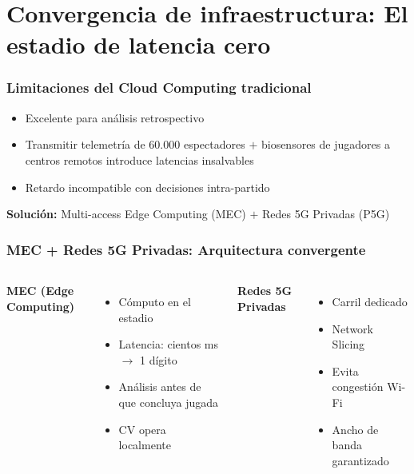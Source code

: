 \documentclass[aspectratio=169]{beamer}
\begin{document}
\section{Convergencia de infraestructura: El estadio de latencia cero}
\frame{\sectionpage}

\begin{frame}\frametitle{Limitaciones del Cloud Computing tradicional}
\begin{itemize}
    \item Excelente para análisis retrospectivo
    \item Transmitir telemetría de 60.000 espectadores $+$ biosensores de jugadores a centros remotos introduce latencias insalvables
    \item Retardo incompatible con decisiones intra-partido
\end{itemize}
\textbf{Solución:} Multi-access Edge Computing (MEC) $+$ Redes 5G Privadas (P5G)
\end{frame}

\begin{frame}\frametitle{MEC + Redes 5G Privadas: Arquitectura convergente}
\begin{columns}[T]
\textbf{MEC (Edge Computing)}
\begin{itemize}
    \item Cómputo en el estadio
    \item Latencia: cientos ms $\rightarrow$ 1 dígito
    \item Análisis antes de que concluya jugada
    \item CV opera localmente
\end{itemize}

\textbf{Redes 5G Privadas}
\begin{itemize}
    \item Carril dedicado
    \item Network Slicing
    \item Evita congestión Wi-Fi
    \item Ancho de banda garantizado
\end{itemize}
\end{columns}
\end{frame}
\end{document}
